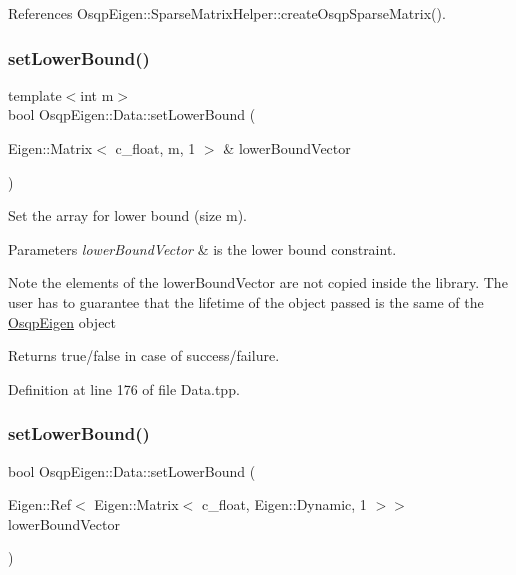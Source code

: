 References Osqp\+Eigen\+::\+Sparse\+Matrix\+Helper\+::create\+Osqp\+Sparse\+Matrix().

\mbox{\label{classOsqpEigen_1_1Data_a2309f26732b40ef31a639ab8d0478e18}} 
\subsubsection{\texorpdfstring{set\+Lower\+Bound()}{setLowerBound()}\hspace{0.1cm}{\footnotesize\ttfamily [1/2]}}
{\footnotesize\ttfamily template$<$int m$>$ \\
bool Osqp\+Eigen\+::\+Data\+::set\+Lower\+Bound (\begin{DoxyParamCaption}\item[{Eigen\+::\+Matrix$<$ c\+\_\+float, m, 1 $>$ \&}]{lower\+Bound\+Vector }\end{DoxyParamCaption})}



Set the array for lower bound (size m). 


\begin{DoxyParams}{Parameters}
{\em lower\+Bound\+Vector} & is the lower bound constraint. \\
\hline
\end{DoxyParams}
\begin{DoxyNote}{Note}
the elements of the lower\+Bound\+Vector are not copied inside the library. The user has to guarantee that the lifetime of the object passed is the same of the \mbox{\hyperlink{namespaceOsqpEigen}{Osqp\+Eigen}} object 
\end{DoxyNote}
\begin{DoxyReturn}{Returns}
true/false in case of success/failure. 
\end{DoxyReturn}


Definition at line 176 of file Data.\+tpp.

\mbox{\label{classOsqpEigen_1_1Data_aaa6bdc5a9905c3719d5b198106ed4683}} 
\subsubsection{\texorpdfstring{set\+Lower\+Bound()}{setLowerBound()}\hspace{0.1cm}{\footnotesize\ttfamily [2/2]}}
{\footnotesize\ttfamily bool Osqp\+Eigen\+::\+Data\+::set\+Lower\+Bound (\begin{DoxyParamCaption}\item[{Eigen\+::\+Ref$<$ Eigen\+::\+Matrix$<$ c\+\_\+float, Eigen\+::\+Dynamic, 1 $>$$>$}]{lower\+Bound\+Vector }\end{DoxyParamCaption})}



